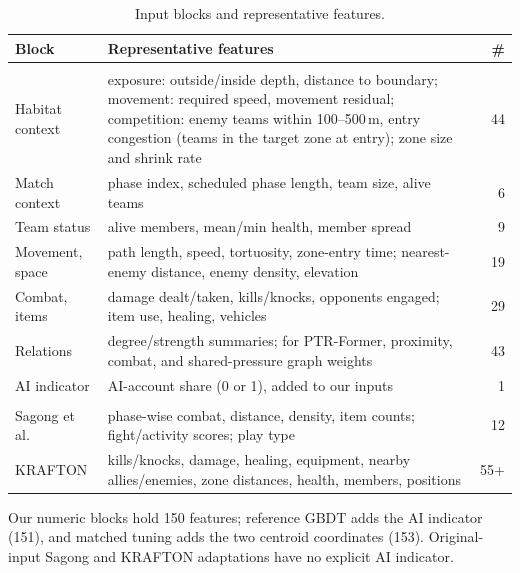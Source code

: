 \documentclass[sigconf,anonymous,nonacm]{acmart}
\begin{document}
\begin{table}[t]
\centering
\caption{Input blocks and representative features.}
\label{tab:blocks}
\footnotesize
\setlength{\tabcolsep}{3pt}
\begin{tabular}{>{\raggedright\arraybackslash}p{1.45cm}p{5.8cm}r}
\hline
Block & Representative features & \# \\
\hline
\multicolumn{3}{l}{\emph{Our inputs}} \\
Habitat context & exposure: outside/inside depth, distance to boundary; movement: required speed, movement residual; competition: enemy teams within 100--500\,m, entry congestion (teams in the target zone at entry); zone size and shrink rate & 44 \\
Match context & phase index, scheduled phase length, team size, alive teams & 6 \\
Team status & alive members, mean/min health, member spread & 9 \\
Movement, space & path length, speed, tortuosity, zone-entry time; nearest-enemy distance, enemy density, elevation & 19 \\
Combat, items & damage dealt/taken, kills/knocks, opponents engaged; item use, healing, vehicles & 29 \\
Relations & degree/strength summaries; for PTR-Former, proximity, combat, and shared-pressure graph weights & 43 \\
AI indicator & AI-account share (0 or 1), added to our inputs & 1 \\
\hline
\multicolumn{3}{l}{\emph{Prior designs}} \\
Sagong et al. & phase-wise combat, distance, density, item counts; fight/activity scores; play type & 12 \\
KRAFTON & kills/knocks, damage, healing, equipment, nearby allies/enemies, zone distances, health, members, positions & 55+ \\
\hline
\end{tabular}
\smallskip
\parbox{\columnwidth}{\scriptsize Our numeric blocks hold 150 features; reference GBDT adds the AI indicator (151), and matched tuning adds the two centroid coordinates (153). Original-input Sagong and KRAFTON adaptations have no explicit AI indicator.}
\end{table}
\end{document}
